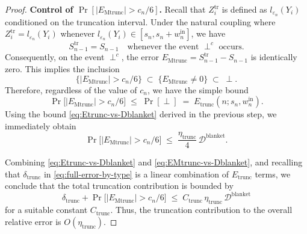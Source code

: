 \documentclass{article}
\theoremstyle{plain}
\theoremstyle{definition}
\begin{document}
\begin{proof}
\textbf{Control of $\Pr\left[|E_{\mathrm{Mtrunc}}|>c_n/6\right]$.}
Recall that $Z_i^{\mathrm{tr}}$ is defined as $l_{\varepsilon_n}(Y_i)$ conditioned on the truncation interval.
Under the natural coupling where $Z_i^{\mathrm{tr}} = l_{\varepsilon_n}(Y_i)$ whenever $l_{\varepsilon_n}(Y_i) \in [s_n, s_n+w_n^{\mathrm{in}}]$, we have
\[
  S_{n-1}^{\mathrm{tr}} = S_{n-1}
  \quad \text{whenever the event } \perp^c \text{ occurs}.
\]
Consequently, on the event $\perp^c$, the error $E_{\mathrm{Mtrunc}} = S_{n-1}^{\mathrm{tr}} - S_{n-1}$ is identically zero.
This implies the inclusion
\[
  \bigl\{|E_{\mathrm{Mtrunc}}| > c_n/6\bigr\}
  \;\subset\;
  \bigl\{E_{\mathrm{Mtrunc}} \neq 0\bigr\}
  \;\subset\;
  \perp.
\]
Therefore, regardless of the value of $c_n$, we have the simple bound
\begin{equation}
  \label{eq:EMtrunc-simple-bound}
  \Pr\bigl[|E_{\mathrm{Mtrunc}}| > c_n/6\bigr]
  \;\le\;
  \Pr[\perp]
  \;=\;
  E_{\mathrm{trunc}}(n;s_n,w_n^{\mathrm{in}}).
\end{equation}
Using the bound \eqref{eq:Etrunc-vs-Dblanket} derived in the previous step, we immediately obtain
\begin{equation}
  \label{eq:EMtrunc-vs-Dblanket}
  \Pr\bigl[|E_{\mathrm{Mtrunc}}| > c_n/6\bigr]
  \;\le\;
  \frac{\eta_{\mathrm{trunc}}}{4}\,\mathcal{D}^{\mathrm{blanket}}.
\end{equation}

\medskip

Combining \eqref{eq:Etrunc-vs-Dblanket} and \eqref{eq:EMtrunc-vs-Dblanket}, and recalling that $\delta_{\mathrm{trunc}}$ in \eqref{eq:full-error-by-type} is a linear combination of $E_{\mathrm{trunc}}$ terms, we conclude that the total truncation contribution is bounded by
\[
  \delta_{\mathrm{trunc}}
  +
  \Pr\bigl[|E_{\mathrm{Mtrunc}}|>c_n/6\bigr]
  \;\le\;
  C_{\mathrm{trunc}}\,
  \eta_{\mathrm{trunc}}\,
  \mathcal{D}^{\mathrm{blanket}}
\]
for a suitable constant $C_{\mathrm{trunc}}$.
Thus, the truncation contribution to the overall relative error is $O(\eta_{\mathrm{trunc}})$.

\medskip

\noindent



\end{proof}
\end{document}
